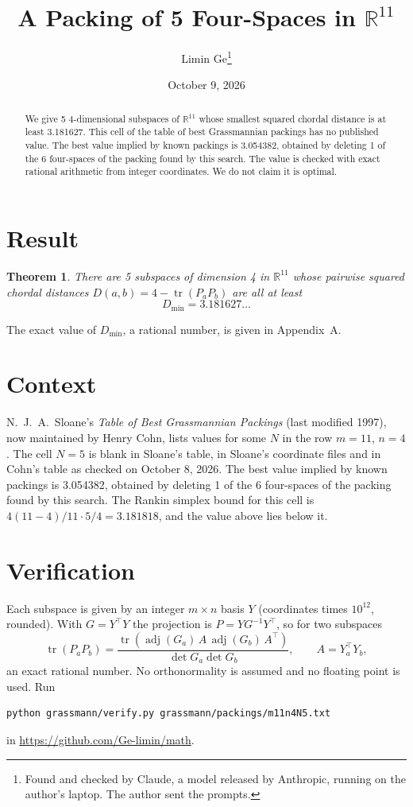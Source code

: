 \documentclass[11pt,a4paper]{article}
\title{A Packing of 5 Four-Spaces in $\mathbb{R}^{11}$}
\author{Limin Ge\thanks{Found and checked by Claude, a model released by Anthropic, running on the author's laptop. The author sent the prompts.}}
\date{October 9, 2026}
\newtheorem*{theorem}{Theorem}
\begin{document}
\maketitle
\begin{abstract}
We give 5 4-dimensional subspaces of $\mathbb{R}^{11}$ whose smallest squared chordal distance is at least 3.181627. This cell of the table of best Grassmannian packings has no published value. The best value implied by known packings is 3.054382, obtained by deleting 1 of the 6 four-spaces of the packing found by this search. The value is checked with exact rational arithmetic from integer coordinates. We do not claim it is optimal.
\end{abstract}

\section{Result}
\begin{theorem}
There are 5 subspaces of dimension 4 in $\mathbb{R}^{11}$ whose pairwise squared chordal distances $D(a,b) = 4 - \operatorname{tr}(P_aP_b)$ are all at least
\[ D_{\min} = 3.181627\ldots \]
\end{theorem}
The exact value of $D_{\min}$, a rational number, is given in Appendix~A.


\section{Context}
N.~J.~A.~Sloane's \emph{Table of Best Grassmannian Packings} (last modified 1997), now maintained by Henry Cohn, lists values for some $N$ in the row $m=11$, $n=4$. The cell $N=5$ is blank in Sloane's table, in Sloane's coordinate files and in Cohn's table as checked on October 8, 2026. The best value implied by known packings is 3.054382, obtained by deleting 1 of the 6 four-spaces of the packing found by this search. The Rankin simplex bound for this cell is $4(11-4)/11\cdot 5/4 = 3.181818$, and the value above lies below it.


\section{Verification}
Each subspace is given by an integer $m\times n$ basis $Y$ (coordinates times $10^{12}$, rounded). With $G=Y^\top Y$ the projection is $P=YG^{-1}Y^\top$, so for two subspaces
\[ \operatorname{tr}(P_aP_b)=\frac{\operatorname{tr}(\operatorname{adj}(G_a)\,A\,\operatorname{adj}(G_b)\,A^\top)}{\det G_a\det G_b},\qquad A=Y_a^\top Y_b, \]
an exact rational number. No orthonormality is assumed and no floating point is used. Run
\begin{verbatim}
python grassmann/verify.py grassmann/packings/m11n4N5.txt
\end{verbatim}
in \url{https://github.com/Ge-limin/math}.
\end{document}
